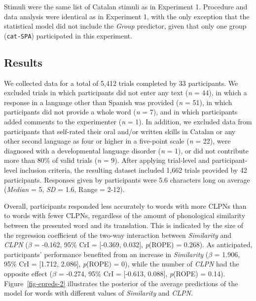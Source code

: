 \documentclass[
]{article}
\begin{document}
Stimuli were the same list of Catalan stimuli as in Experiment 1.
Procedure and data analysis were identical as in Experiment 1, with the
only exception that the statistical model did not include the
\emph{Group} predictor, given that only one group (\texttt{cat-SPA})
participated in this experiment.

\subsection{Results}\label{results-1}

We collected data for a total of 5,412 trials completed by 33
participants. We excluded trials in which participants did not enter any
text (\emph{n} = 44), in which a response in a language other than
Spanish was provided (\emph{n} = 51), in which participants did not
provide a whole word (\emph{n} = 7), and in which participants added
comments to the experimenter (\emph{n} = 1). In addition, we excluded
data from participants that self-rated their oral and/or written skills
in Catalan or any other second language as four or higher in a
five-point scale (\emph{n} = 22), were diagnosed with a developmental
language disorder (\emph{n} = 1), or did not contribute more than 80\%
of valid trials (\emph{n} = 9). After applying trial-level and
participant-level inclusion criteria, the resulting dataset included
1,662 trials provided by 42 participants. Responses given by
participants were 5.6 characters long on average (\emph{Median} = 5,
\emph{SD} = 1.6, Range = 2-12).

Overall, participants responded less accurately to words with more CLPNs
than to words with fewer CLPNs, regardless of the amount of phonological
similarity between the presented word and its translation. This is
indicated by the size of the regression coefficient of the two-way
interaction between \emph{Similarity} and \emph{CLPN} (\(\beta\) =
-0.162, 95\% CrI = {[}-0.369, 0.032{]}, \emph{p}(ROPE) = 0.268). As
anticipated, participants' performance benefited from an increase in
\emph{Similarity} (\(\beta\) = 1.906, 95\% CrI = {[}1.712, 2.086{]},
\emph{p}(ROPE) = 0), while the number of \emph{CLPN} had the opposite
effect (\(\beta\) = -0.274, 95\% CrI = {[}-0.613, 0.088{]},
\emph{p}(ROPE) = 0.14). Figure~\ref{fig-epreds-2} illustrates the
posterior of the average predictions of the model for words with
different values of \emph{Similarity} and \emph{CLPN}.
\end{document}
